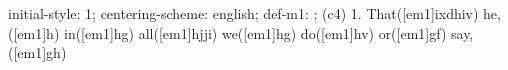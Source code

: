 initial-style: 1;
centering-scheme: english;
def-m1: \grealign;
(c4) 1. That([em1]ixdhiv) he,([em1]h) in([em1]hg) all([em1]hjji) we([em1]hg) do([em1]hv) or([em1]gf) say,([em1]gh)